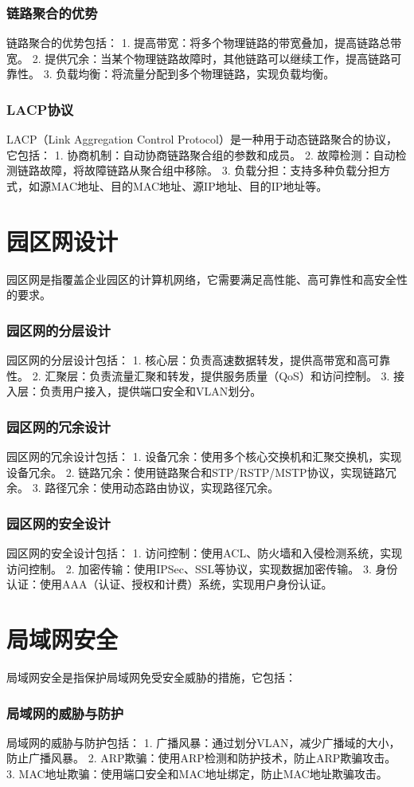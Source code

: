 \documentclass{book}
\begin{document}
\subsubsection{链路聚合的优势}
链路聚合的优势包括：
1. 提高带宽：将多个物理链路的带宽叠加，提高链路总带宽。
2. 提供冗余：当某个物理链路故障时，其他链路可以继续工作，提高链路可靠性。
3. 负载均衡：将流量分配到多个物理链路，实现负载均衡。
\subsubsection{LACP协议}
LACP（Link Aggregation Control Protocol）是一种用于动态链路聚合的协议，它包括：
1. 协商机制：自动协商链路聚合组的参数和成员。
2. 故障检测：自动检测链路故障，将故障链路从聚合组中移除。
3. 负载分担：支持多种负载分担方式，如源MAC地址、目的MAC地址、源IP地址、目的IP地址等。
\section{园区网设计}
园区网是指覆盖企业园区的计算机网络，它需要满足高性能、高可靠性和高安全性的要求。
\subsubsection{园区网的分层设计}
园区网的分层设计包括：
1. 核心层：负责高速数据转发，提供高带宽和高可靠性。
2. 汇聚层：负责流量汇聚和转发，提供服务质量（QoS）和访问控制。
3. 接入层：负责用户接入，提供端口安全和VLAN划分。
\subsubsection{园区网的冗余设计}
园区网的冗余设计包括：
1. 设备冗余：使用多个核心交换机和汇聚交换机，实现设备冗余。
2. 链路冗余：使用链路聚合和STP/RSTP/MSTP协议，实现链路冗余。
3. 路径冗余：使用动态路由协议，实现路径冗余。
\subsubsection{园区网的安全设计}
园区网的安全设计包括：
1. 访问控制：使用ACL、防火墙和入侵检测系统，实现访问控制。
2. 加密传输：使用IPSec、SSL等协议，实现数据加密传输。
3. 身份认证：使用AAA（认证、授权和计费）系统，实现用户身份认证。
\section{局域网安全}
局域网安全是指保护局域网免受安全威胁的措施，它包括：
\subsubsection{局域网的威胁与防护}
局域网的威胁与防护包括：
1. 广播风暴：通过划分VLAN，减少广播域的大小，防止广播风暴。
2. ARP欺骗：使用ARP检测和防护技术，防止ARP欺骗攻击。
3. MAC地址欺骗：使用端口安全和MAC地址绑定，防止MAC地址欺骗攻击。
\end{document}
